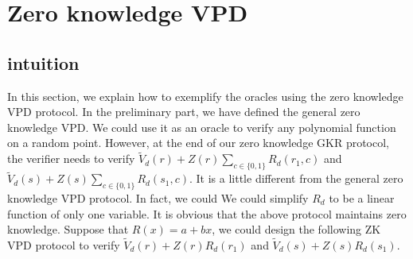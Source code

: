 \section{Zero knowledge VPD}
\subsection{intuition}
In this section, we explain how to exemplify the oracles using the zero knowledge VPD protocol. In the preliminary part, we have defined the general zero knowledge VPD. We could use it as an oracle to verify any polynomial function on a random point. However, at the end of our zero knowledge GKR protocol, the verifier needs to verify $\tilde{V}_d(r) + Z(r)\sum\limits_{c \in \{0, 1\}}R_d(r_1, c)$ and $\tilde{V}_d(s) + Z(s)\sum\limits_{c \in \{0, 1\}}R_d(s_1, c)$. It is a little different from the general zero knowledge VPD protocol. In fact, we could We could simplify $R_d$ to be a linear function of only one variable. It is obvious that the above protocol maintains zero knowledge. Suppose that $R(x) = a + bx$, we could design the following ZK VPD protocol to verify $\tilde{V}_d(r) + Z(r)R_d(r_1)$ and $\tilde{V}_d(s) + Z(s)R_d(s_1)$.
